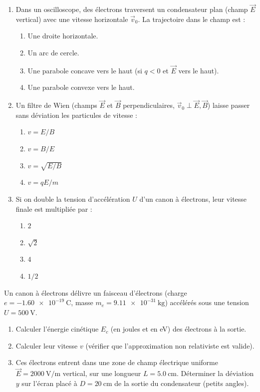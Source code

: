\documentclass[11pt]{article}
\begin{document}
\begin{exercice}
\begin{enumerate}
    \item Dans un oscilloscope, des électrons traversent un condensateur plan (champ $\vec{E}$ vertical) avec une vitesse horizontale $\vec{v}_0$. La trajectoire dans le champ est :
    \begin{enumerate}
        \item Une droite horizontale.
        \item Un arc de cercle.
        \item Une parabole concave vers le haut (si $q<0$ et $\vec{E}$ vers le haut).
        \item Une parabole convexe vers le haut.
    \end{enumerate}
    \item Un filtre de Wien (champs $\vec{E}$ et $\vec{B}$ perpendiculaires, $\vec{v}_0 \perp \vec{E}, \vec{B}$) laisse passer sans déviation les particules de vitesse :
    \begin{enumerate}
        \item $v = E/B$
        \item $v = B/E$
        \item $v = \sqrt{E/B}$
        \item $v = qE/m$
    \end{enumerate}
    \item Si on double la tension d'accélération $U$ d'un canon à électrons, leur vitesse finale est multipliée par :
    \begin{enumerate}
        \item $2$
        \item $\sqrt{2}$
        \item $4$
        \item $1/2$
    \end{enumerate}
\end{enumerate}
\end{exercice}

\begin{exercice}
Un canon à électrons délivre un faisceau d'électrons (charge $e = \SI{-1,60e-19}{\coulomb}$, masse $m_e = \SI{9,11e-31}{\kilogram}$) accélérés sous une tension $U = \SI{500}{\volt}$.
\begin{enumerate}
    \item Calculer l'énergie cinétique $E_c$ (en joules et en eV) des électrons à la sortie.
    \item Calculer leur vitesse $v$ (vérifier que l'approximation non relativiste est valide).
    \item Ces électrons entrent dans une zone de champ électrique uniforme $\vec{E} = \SI{2000}{\volt\per\meter}$ vertical, sur une longueur $L = \SI{5,0}{\centi\meter}$. Déterminer la déviation $y$ sur l'écran placé à $D = \SI{20}{\centi\meter}$ de la sortie du condensateur (petits angles).
\end{enumerate}
\end{exercice}
\end{document}
